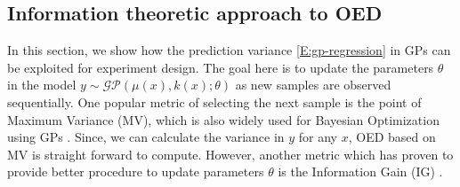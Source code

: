 \subsection{Information theoretic approach to OED}

In this section, we show how the prediction variance \eqref{E:gp-regression} in GPs can be exploited for experiment design.
The goal here is to update the parameters \(\theta\) in the model \(y \sim \mathcal{GP}(\mu(x), k(x); \theta)\) as new samples are observed sequentially. One popular metric of selecting the next sample is the point of Maximum Variance (MV), which is also widely used for Bayesian Optimization using GPs \cite{Snoek2012}. Since, we can calculate the variance in \(y\) for any \(x\), OED based on MV is straight forward to compute. However, another metric which has proven to provide better procedure to update parameters \(\theta\) is the Information Gain (IG) \cite{Krause2008}. 

